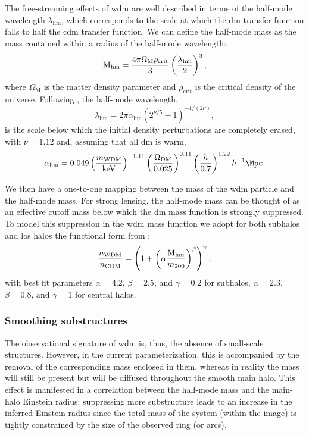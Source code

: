 The free-streaming effects of \gls*{wdm} are well described in terms of the half-mode wavelength $\lambda_{\mathrm{hm}}$, which corresponds to the scale at which the \gls*{dm} transfer function falls to half the \gls*{cdm} transfer function. We can define the half-mode mass as the mass contained within a radius of the half-mode wavelength:
\begin{equation}
\mathrm{M_{hm}}=\frac{4\pi\Omega_{\mathrm{M}}\rho_{\mathrm{crit}}}{3}\left(\frac{\lambda_{\mathrm{hm}}}{2}\right)^3,
\end{equation}
where $\Omega_{\mathrm{M}}$ is the matter density parameter and $\rho_{\mathrm{crit}}$ is the critical density of the universe.
Following \cite{Schneider:2011yu}, the half-mode wavelength,
\begin{equation}
    \lambda_{\mathrm{hm}}=2\pi\alpha_{\mathrm{hm}}\left(2^{\nu/5}-1\right)^{-1/(2\nu)},
\end{equation}    
is the scale below which the initial density perturbations are completely erased, with $\nu= 1.12$ and, assuming that all \gls*{dm} is warm,
\begin{equation}
\alpha_{\mathrm{hm}}=0.049\left(\frac{m_\mathrm{WDM}}{\si{\keV}}\right)^{-1.11}\left(\frac{\Omega_\mathrm{DM}}{0.025}\right)^{0.11}\left(\frac{h}{0.7}\right)^{1.22}h^{-1}\si{\Mpc}.
\end{equation}

We then have a one-to-one mapping between the mass of the \gls*{wdm} particle and the half-mode mass.
For strong lensing, the half-mode mass can be thought of as an effective cutoff mass below which the \gls*{dm} mass function is strongly suppressed. To model this suppression in the \gls*{wdm} mass function we adopt for both subhalos and \gls*{los} halos the functional form from \cite{Lovell:2020bcy}:
\begin{equation}\label{eq:cutoff}
    \frac{n_{\mathrm{WDM}}}{n_{\mathrm{CDM}}}=\left(1+\left(\alpha\frac{\mathrm{M_{hm}}}{m_{200}}\right)^\beta\right)^\gamma,
\end{equation}
with best fit parameters $\alpha=4.2$, $\beta=2.5$, and $\gamma=0.2$ for subhalos, $\alpha=2.3$, $\beta=0.8$, and $\gamma=1$ for central halos.

\subsubsection{Smoothing substructures}
\label{subsubsec:smoothing}

The observational signature of \gls*{wdm} is, thus, the absence of small-scale structures. However, in the current parameterization, this is accompanied by the removal of the corresponding mass enclosed in them, whereas in reality the mass will still be present but will be diffused throughout the smooth main halo. This effect is manifested in a correlation between the half-mode mass and the main-halo Einstein radius: suppressing more substructure leads to an increase in the inferred Einstein radius since the total mass of the system (within the image) is tightly constrained by the size of the observed ring (or arcs).

